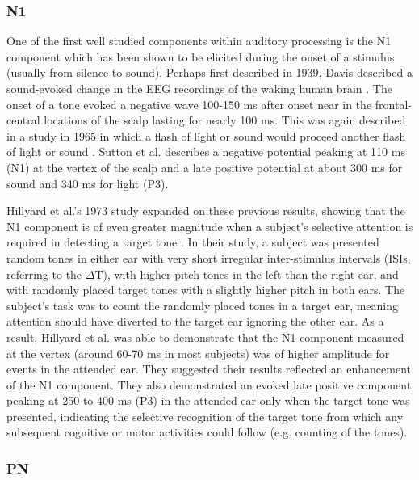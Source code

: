 \documentclass[a4paper,10pt,final]{ThesisStyle}
\begin{document}
\subsubsection{N1}

One of the first well studied components within auditory processing is the N1 component which has been shown to be elicited during the onset of a stimulus (usually from silence to sound).  Perhaps first described in 1939, Davis described a sound-evoked change in the EEG recordings of the waking human brain \cite{Davis1939}.  The onset of a tone evoked a negative wave 100-150 ms after onset near in the frontal-central locations of the scalp lasting for nearly 100 ms.  This was again described in a study in 1965 in which a flash of light or sound would proceed another flash of light or sound \cite{Sutton1965}.  Sutton et al. describes a negative potential peaking at 110 ms (N1) at the vertex of the scalp and a late positive potential at about 300 ms for sound and 340 ms for light (P3).  

Hillyard et al.'s 1973 study expanded on these previous results, showing that the N1 component is of even greater magnitude when a subject's selective attention is required in detecting a target tone \cite{Hillyard1973}.   In their study, a subject was presented random tones in either ear with very short irregular inter-stimulus intervals (ISIs, referring to the $\Delta \text{T}$), with higher pitch tones in the left than the right ear, and with randomly placed target tones with a slightly higher pitch in both ears.  The subject's task was to count the randomly placed tones in a target ear, meaning attention should have diverted to the target ear ignoring the other ear.  As a result, Hillyard et al. was able to demonstrate that the N1 component measured at the vertex (around 60-70 ms in most subjects) was of higher amplitude for events in the attended ear.  They suggested their results reflected an enhancement of the N1 component.  They also demonstrated an evoked late positive component peaking at 250 to 400 ms (P3) in the attended ear only when the target tone was presented, indicating the selective recognition of the target tone from which any subsequent cognitive or motor activities could follow (e.g. counting of the tones). 

\subsubsection{PN}
\end{document}
